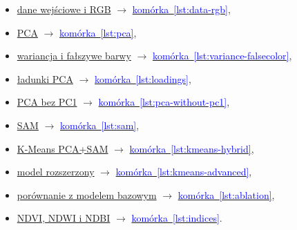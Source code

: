 \documentclass[12pt,a4paper]{article}
\newcommand{\kodref}[2]{\hyperref[#1]{\textcolor{blue}{#2}}}
\begin{document}
\begin{itemize}
	\item \hyperref[sec:dane]{dane wejściowe i RGB} $\rightarrow$ \kodref{lst:data-rgb}{komórka~\ref*{lst:data-rgb}},
	\item \hyperref[sec:pca]{PCA} $\rightarrow$ \kodref{lst:pca}{komórka~\ref*{lst:pca}},
	\item \hyperref[sec:wariancja]{wariancja i fałszywe barwy} $\rightarrow$ \kodref{lst:variance-falsecolor}{komórka~\ref*{lst:variance-falsecolor}},
	\item \hyperref[sec:ladunki]{ładunki PCA} $\rightarrow$ \kodref{lst:loadings}{komórka~\ref*{lst:loadings}},
	\item \hyperref[sec:bezpc1]{PCA bez PC1} $\rightarrow$ \kodref{lst:pca-without-pc1}{komórka~\ref*{lst:pca-without-pc1}},
	\item \hyperref[sec:sam]{SAM} $\rightarrow$ \kodref{lst:sam}{komórka~\ref*{lst:sam}},
	\item \hyperref[sec:kmeans]{K-Means PCA+SAM} $\rightarrow$ \kodref{lst:kmeans-hybrid}{komórka~\ref*{lst:kmeans-hybrid}},
	\item \hyperref[sec:model-rozszerzony]{model rozszerzony} $\rightarrow$ \kodref{lst:kmeans-advanced}{komórka~\ref*{lst:kmeans-advanced}},
	\item \hyperref[sec:porownanie-baza]{porównanie z modelem bazowym} $\rightarrow$ \kodref{lst:ablation}{komórka~\ref*{lst:ablation}},
	\item \hyperref[sec:indeksy]{NDVI, NDWI i NDBI} $\rightarrow$ \kodref{lst:indices}{komórka~\ref*{lst:indices}}.
\end{itemize}
\end{document}
